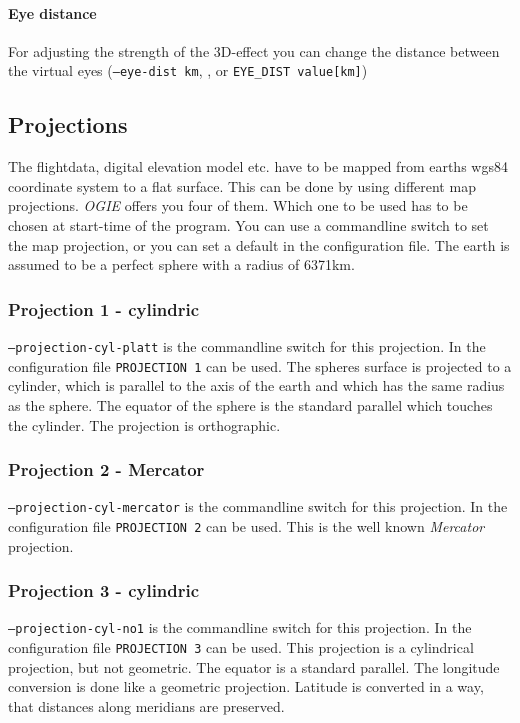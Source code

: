 \paragraph{Eye distance}
For adjusting the strength of the 3D-effect you can change the distance between
the virtual eyes (\texttt{--eye-dist km}, ,  or \texttt{EYE\_DIST value[km]})


\subsection{Projections}
\label{projections}

The flightdata, digital elevation model etc. have to be mapped from earths wgs84 coordinate system to a flat surface. This can be done by using different map projections. \emph{OGIE} offers you four of them.  Which one to be used has to be chosen at start-time of the program. You can use a commandline switch to set the map projection, or you can set a default in the configuration file.
The earth is assumed to be a perfect sphere with a radius of 6371km.

\subsubsection{Projection 1 - cylindric}
\texttt{--projection-cyl-platt} is the commandline switch for this projection. In the configuration file \texttt{PROJECTION 1} can be used. The spheres surface is projected to a cylinder, which is parallel to the axis of the earth and which has the same radius as the sphere. The equator of the sphere is the standard parallel which touches the cylinder. The projection is orthographic.

\subsubsection{Projection 2 - Mercator}
\texttt{--projection-cyl-mercator} is the commandline switch for this projection. In the configuration file \texttt{PROJECTION 2} can be used. This is the well known \emph{Mercator} projection.

\subsubsection{Projection 3 - cylindric}
\texttt{--projection-cyl-no1} is the commandline switch for this projection. In the configuration file \texttt{PROJECTION 3} can be used. This projection is a cylindrical projection, but not geometric. The equator is a standard parallel. The longitude conversion is done like a geometric projection. Latitude is converted in a way, that distances along meridians are preserved.

